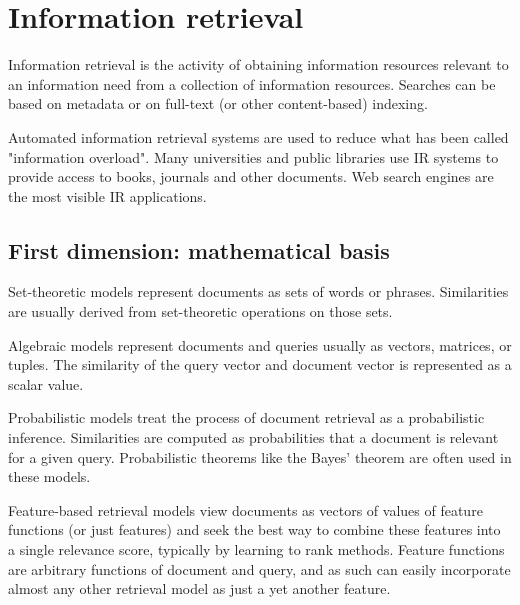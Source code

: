 \documentclass[12pt]{book}
\begin{document}
\section{Information retrieval}
Information retrieval\cite{wikipedia-inforet} is the activity of obtaining information resources relevant to an information need from a collection of information resources. Searches can be based on metadata or on full-text (or other content-based) indexing.

Automated information retrieval systems are used to reduce what has been called "information overload". Many universities and public libraries use IR systems to provide access to books, journals and other documents. Web search engines are the most visible IR applications.

\subsection{First dimension: mathematical basis}
\begin{itemize*}
  \item Set-theoretic models represent documents as sets of words or phrases. Similarities are usually derived from set-theoretic operations on those sets. 
  \item Algebraic models represent documents and queries usually as vectors, matrices, or tuples. The similarity of the query vector and document vector is represented as a scalar value.
  \item Probabilistic models treat the process of document retrieval as a probabilistic inference. Similarities are computed as probabilities that a document is relevant for a given query. Probabilistic theorems like the Bayes' theorem are often used in these models.
  \item Feature-based retrieval models view documents as vectors of values of feature functions (or just features) and seek the best way to combine these features into a single relevance score, typically by learning to rank methods. Feature functions are arbitrary functions of document and query, and as such can easily incorporate almost any other retrieval model as just a yet another feature.
\end{itemize*}
\end{document}
